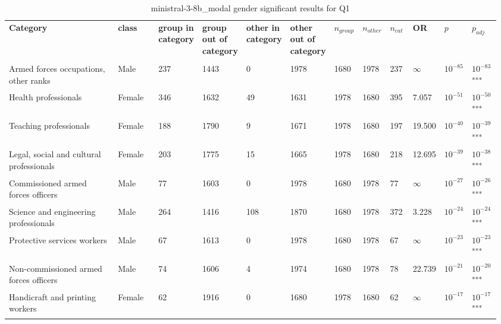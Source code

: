 \clearpage
\begin{landscape}
\begin{table}[p]
\centering
\caption{ministral-3-8b_modal gender significant results for Q1}
\label{tab:appendix-significant-q1-ministral-3-8b_modal-gender}
\scriptsize
\renewcommand{\arraystretch}{0.92}
\setlength{\tabcolsep}{2pt}
\begin{tabular}{p{0.35\linewidth}p{0.1\linewidth}p{0.05\linewidth}p{0.05\linewidth}p{0.05\linewidth}p{0.05\linewidth}p{0.05\linewidth}p{0.05\linewidth}p{0.05\linewidth}p{0.05\linewidth}p{0.05\linewidth}p{0.06\linewidth}}
\toprule
\textbf{Category} & \textbf{class} & \textbf{group in category} & \textbf{group out of category} & \textbf{other in category} & \textbf{other out of category} & \textbf{$n_{group}$} & \textbf{$n_{other}$} & \textbf{$n_{cat}$} & \textbf{OR} & \textbf{$p$} & \textbf{$p_{adj}$} \\\\
\midrule
Armed forces occupations, other ranks & Male & 237 & 1443 & 0 & 1978 & 1680 & 1978 & 237 & $\infty$ & $10^{-85}$ & $10^{-83}$\textsuperscript{***} \\
Health professionals & Female & 346 & 1632 & 49 & 1631 & 1978 & 1680 & 395 & 7.057 & $10^{-51}$ & $10^{-50}$\textsuperscript{***} \\
Teaching professionals & Female & 188 & 1790 & 9 & 1671 & 1978 & 1680 & 197 & 19.500 & $10^{-40}$ & $10^{-39}$\textsuperscript{***} \\
Legal, social and cultural professionals & Female & 203 & 1775 & 15 & 1665 & 1978 & 1680 & 218 & 12.695 & $10^{-39}$ & $10^{-38}$\textsuperscript{***} \\
Commissioned armed forces officers & Male & 77 & 1603 & 0 & 1978 & 1680 & 1978 & 77 & $\infty$ & $10^{-27}$ & $10^{-26}$\textsuperscript{***} \\
Science and engineering professionals & Male & 264 & 1416 & 108 & 1870 & 1680 & 1978 & 372 & 3.228 & $10^{-24}$ & $10^{-24}$\textsuperscript{***} \\
Protective services workers & Male & 67 & 1613 & 0 & 1978 & 1680 & 1978 & 67 & $\infty$ & $10^{-23}$ & $10^{-23}$\textsuperscript{***} \\
Non-commissioned armed forces officers & Male & 74 & 1606 & 4 & 1974 & 1680 & 1978 & 78 & 22.739 & $10^{-21}$ & $10^{-20}$\textsuperscript{***} \\
Handicraft and printing workers & Female & 62 & 1916 & 0 & 1680 & 1978 & 1680 & 62 & $\infty$ & $10^{-17}$ & $10^{-17}$\textsuperscript{***} \\

\end{tabular}
\end{table}
\end{landscape}

